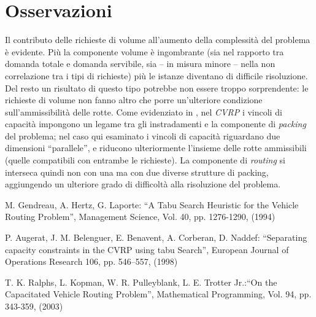 \documentclass[11pt,oneside,a4paper]{article}
\begin{document}
\section{Osservazioni}
Il contributo delle richieste di volume all'aumento della complessità del problema è evidente. Più 
la componente volume è ingombrante (sia nel rapporto tra domanda totale e domanda servibile, sia -- in
misura minore -- nella non correlazione tra i tipi di richieste) più le istanze diventano di difficile
risoluzione. Del resto un risultato di questo tipo potrebbe non essere troppo sorprendente: le richieste di
volume non fanno altro che porre un'ulteriore condizione sull'ammissibilità delle rotte.
Come evidenziato in \cite{ralphs03}, nel \emph{CVRP} i vincoli di capacità impongono un legame tra gli
instradamenti e la componente di \emph{packing} del problema; nel caso qui esaminato i vincoli di capacità
riguardano due dimensioni ``parallele'', e riducono ulteriormente l'insieme delle rotte ammissibili (quelle
compatibili con entrambe le richieste). La componente di \emph{routing} si interseca quindi non con una
ma con due diverse strutture di packing, aggiungendo un ulteriore grado di difficoltà alla risoluzione
del problema.

\begin{thebibliography}{99}
M. Gendreau, A. Hertz, G. Laporte: ``A Tabu Search Heuristic for the
Vehicle Routing Problem'', Management Science, Vol. 40, pp. 1276-1290, (1994)

P. Augerat, J. M. Belenguer, E. Benavent, A. Corberan, D. Naddef: ``Separating capacity
constraints in the CVRP using tabu Search'', European Journal of Operations Research 106, pp.
546–557, (1998)

T. K. Ralphs, L. Kopman, W. R. Pulleyblank, L. E. Trotter Jr.:``On the Capacitated
Vehicle Routing Problem'', Mathematical Programming, Vol. 94, pp. 343-359, (2003)

\end{thebibliography}
\end{document}
